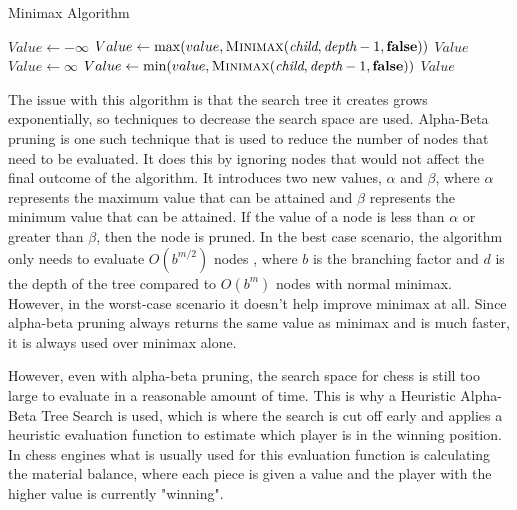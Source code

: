 \begin{algorithm}[h]
    \caption{Minimax Algorithm}
    \begin{algorithmic}
        \State \Return {}
        \EndIf
        \State $Value \gets -\infty$
        \State $Value \gets \max(value, \textsc{Minimax}(\textit{child}, \textit{depth} - 1, \textbf{false}))$
        \EndFor
        \State \Return $Value$
        \Else
        \State $Value \gets \infty$
        \State $Value \gets \min(value, \textsc{Minimax}(\textit{child}, \textit{depth} - 1, \textbf{false}))$
        \EndFor
        \State \Return $Value$
        \EndIf
        \EndFunction
    \end{algorithmic}
\end{algorithm}
The issue with this algorithm is that the search tree it creates grows exponentially, so techniques to decrease the search space are used. Alpha-Beta pruning is one such technique that is used to reduce the number of nodes that need to be evaluated. It does this by ignoring nodes that would not affect the final outcome of the algorithm. It introduces two new values, ${\alpha}$ and ${\beta}$, where ${\alpha}$ represents the maximum value that can be attained and ${\beta}$ represents the minimum value that can be attained. If the value of a node is less than ${\alpha}$ or greater than ${\beta}$, then the node is pruned. In the best case scenario, the algorithm only needs to evaluate ${O(b^{m/2})}$ nodes \cite{russellArtificialIntelligenceModern2022}, where ${b}$ is the branching factor and ${d}$ is the depth of the tree compared to ${O(b^m)}$ nodes with normal minimax. However, in the worst-case scenario it doesn't help improve minimax at all. Since alpha-beta pruning always returns the same value as minimax and is much faster, it is always used over minimax alone.

However, even with alpha-beta pruning, the search space for chess is still too large to evaluate in a reasonable amount of time.  This is why a Heuristic Alpha-Beta Tree Search is used, which is where the search is cut off early and applies a heuristic evaluation function to estimate which player is in the winning position. In chess engines what is usually used for this evaluation function is calculating the material balance, where each piece is given a value and the player with the higher value is currently "winning".


